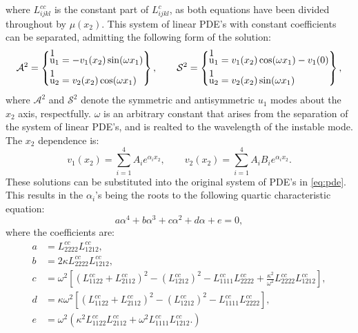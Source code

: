 \documentclass[11pt]{article}
\begin{document}
where $L^{cc}_{ijkl}$ is the constant part of $L^{c}_{ijkl}$, as both equations have been divided throughout by $\mu(x_2)$.
This system of linear PDE's with constant coefficients can be separated, admitting the following form of the solution:
\begin{equation}
\mathcal{A}^2 = 
\left \{ 
\begin{aligned} 
  \stackon{u}{1}_1 &= -v_1(x_2)\sin(\omega x_1) \\
  \stackon{u}{1}_2 &=  v_2(x_2)\cos(\omega x_1)
\end{aligned} 
\right \} , \qquad
\mathcal{S}^2 = 
\left \{ 
\begin{aligned} 
  \stackon{u}{1}_1 &= v_1(x_2)\cos(\omega x_1) - v_1(0) \\
  \stackon{u}{1}_2 &=  v_2(x_2)\sin(\omega x_1)
\end{aligned} 
\right \},
\end{equation}
where $\mathcal{A}^2$ and $\mathcal{S}^2$ denote the symmetric and antisymmetric $u_1$ modes about the $x_2$ axis, respectfully. $\omega$ is an arbitrary constant that arises from the separation of the system of linear PDE's, and is realted to the wavelength of the instable mode. The $x_2$ dependence is:
\begin{equation}
v_1(x_2) = \sum_{i = 1}^{4}A_ie^{\alpha_i x_2}, \qquad v_2(x_2) = \sum_{i = 1}^{4} A_i B_i e^{\alpha_i x_2}.
\end{equation} 
These solutions can be substituted into the original system of PDE's in \eqref{eq:pde}. This results in the $\alpha_i$'s being the roots to the following quartic characteristic equation:
\begin{equation} \label{eq:characteristic}
a\alpha^4 + b\alpha^3 + c\alpha^2 + d\alpha + e = 0,
\end{equation}
where the coefficients are:
\begin{equation*}
\begin{aligned}
  a &= L^{cc}_{2222}L^{cc}_{1212}, \\
  b &= 2\kappa L^{cc}_{2222}L^{cc}_{1212}, \\
  c &= \omega^2 \left[ \left ( L^{cc}_{1122} + L^{cc}_{2112}\right )^2 - \left ( L^{cc}_{1212} \right )^2 - L^{cc}_{1111}L^{cc}_{2222} + \frac{\kappa^2}{\omega^2}L^{cc}_{2222}L^{cc}_{1212}    \right ], \\
  d &= \kappa \omega^2 \left[ \left ( L^{cc}_{1122} + L^{cc}_{2112}\right )^2 - \left ( L^{cc}_{1212} \right )^2 - L^{cc}_{1111}L^{cc}_{2222} \right ], \\
  e &= \omega^2 \left( \kappa^2 L^{cc}_{1122}L^{cc}_{2112} + \omega^2 L^{cc}_{1111}L^{cc}_{1212}. \right)   
\end{aligned}
\end{equation*}
\end{document}
